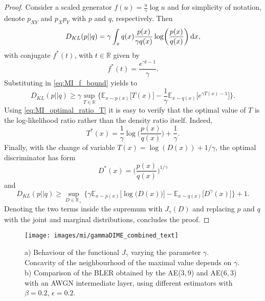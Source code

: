 \begin{proof}
Consider a scaled generator $f(u) = \frac{u}{\gamma}\log u$ and for simplicity of notation, denote $p_{XY}$ and $p_Xp_Y$ with $p$ and $q$, respectively. Then
\begin{equation}
D_{KL}(p||q) = \gamma \int_{x}{q(x) \frac{p(x)}{\gamma q(x)}\log\biggl(\frac{p(x)}{q(x)}\biggr) \mathop{}\!\mathrm{d} x},
\end{equation}
with conjugate $f^*(t)$, with $t \in \mathbb{R}$ given by
\begin{equation}
f^*(t) = \frac{e^{\gamma t -1}}{\gamma}.
\end{equation}
Substituting in \eqref{eq:MI_f_bound} yields to
\begin{equation}
D_{KL}(p||q) \geq \gamma \sup_{T\in \mathbb{R}} \biggl\{ \mathbb{E}_{x \sim p(x)} \bigl[T(x)\bigr]-\frac{1}{\gamma}\mathbb{E}_{x\sim q(x)}\bigl[e^{\gamma T(x)-1} \bigr]\biggr\}.
\end{equation}
Using \eqref{eq:MI_optimal_ratio_T} it is easy to verify that the optimal value of $T$ is the log-likelihood ratio rather than the density ratio itself. Indeed,
\begin{equation}
T^*(x) = \frac{1}{\gamma}\log\biggl(\frac{p(x)}{q(x)}\biggr) + \frac{1}{\gamma}.
\end{equation}
Finally, with the change of variable $T(x)=\log(D(x))+1/{\gamma}$, the optimal discriminator has form
\begin{equation}
D^*(x) = \biggl(\frac{p(x)}{q(x)}\biggr)^{1/\gamma}
\end{equation}
and
\begin{equation}
D_{KL}(p||q) \geq \sup_{D\in \mathbb{R}_+} \biggl\{ \gamma \mathbb{E}_{x \sim p(x)} \bigl[\log \bigl( D(x) \bigr) \bigr] -\mathbb{E}_{x\sim q(x)}\bigl[D^{\gamma}(x) \bigr]\biggr\} + 1.
\end{equation}
Denoting the two terms inside the supremum with $J_{\gamma}(D)$ and replacing $p$ and $q$ with the joint and marginal distributions, concludes the proof.
\end{proof}

\begin{figure}
\centering
  	\texttt{[image: images/mi/gammaDIME\_combined\_text]}
  	\caption{a) Behaviour of the functional $J_{\gamma}$ varying the parameter $\gamma$. Concavity of the neighbourhood of the maximal value depends on $\gamma$. b) Comparison of the BLER obtained by the AE($3,9$) and AE($6,3$) with an AWGN intermediate layer, using different estimators with $\beta = 0.2$, $\epsilon = 0.2$.}
  	\label{fig:MI_gammaDIME}
\end{figure}

